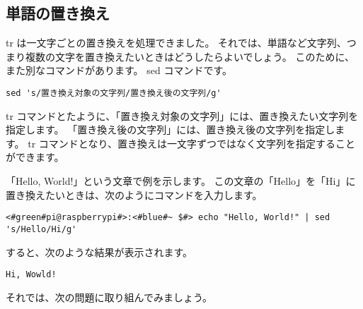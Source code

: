 \begin{tcolorbox}[title=\useOmetoi]
    \begin{enumerate}
    \end{enumerate}
\end{tcolorbox}

\subsection{単語の置き換え}
tr は一文字ごとの置き換えを処理できました。
それでは、単語など文字列、つまり複数の文字を置き換えたいときはどうしたらよいでしょう。
このために、また別なコマンドがあります。
sed コマンドです。

\begin{lstlisting}[caption=sed コマンドの\ruby{基本的}{き|ほん|てき}な使い方, label=sed_usage]
sed 's/置き換え対象の文字列/置き換え後の文字列/g'
\end{lstlisting}

tr コマンドとたように、「置き換え対象の文字列」には、置き換えたい文字列を指定します。
「置き換え後の文字列」には、置き換え後の文字列を指定します。
tr コマンドとなり、置き換えは一文字ずつではなく文字列を指定することができます。

「Hello, World!」という文章で例を示します。
この文章の「Hello」を「Hi」に置き換えたいときは、次のようにコマンドを入力します。

\begin{lstlisting}[caption=sed コマンドを使った例, label=sed_app]
<#green#pi@raspberrypi#>:<#blue#~ $#> echo "Hello, World!" | sed 's/Hello/Hi/g'
\end{lstlisting}

すると、次のような結果が表示されます。

\begin{lstlisting}[caption=sed コマンドで変換した結果, label=sed_result]
Hi, Wowld!
\end{lstlisting}

それでは、次の問題に取り組んでみましょう。

\begin{tcolorbox}[title=\useOmetoi]
\begin{enumerate}
\end{enumerate}
\end{tcolorbox}

